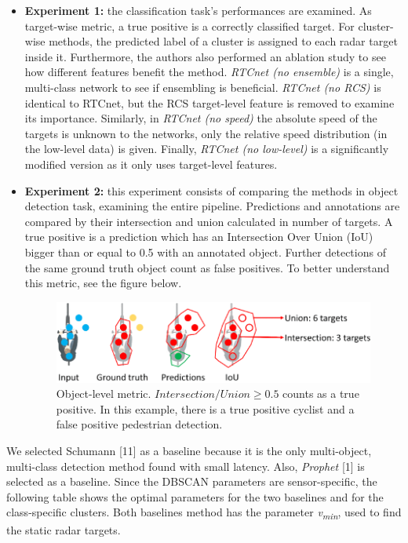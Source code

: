 \begin{itemize}
\item
  \textbf{Experiment 1:} the classification task's performances are
  examined. As target-wise metric, a true positive is a correctly
  classified target. For cluster-wise methods, the predicted label of a
  cluster is assigned to each radar target inside it. Furthermore, the
  authors also performed an ablation study to see how different features
  benefit the method. \emph{RTCnet (no ensemble)} is a single,
  multi-class network to see if ensembling is beneficial. \emph{RTCnet
  (no RCS)} is identical to RTCnet, but the RCS target-level feature is
  removed to examine its importance. Similarly, in \emph{RTCnet (no
  speed)} the absolute speed of the targets is unknown to the networks,
  only the relative speed distribution (in the low-level data) is given.
  Finally, \emph{RTCnet (no low-level)} is a significantly modified
  version as it only uses target-level features.
\item
  \textbf{Experiment 2:} this experiment consists of comparing the
  methods in object detection task, examining the entire pipeline.
  Predictions and annotations are compared by their intersection and
  union calculated in number of targets. A true positive is a prediction
  which has an Intersection Over Union (IoU) bigger than or equal to 0.5
  with an annotated object. Further detections of the same ground truth
  object count as false positives. To better understand this metric, see
  the figure below.
\newpage
  \begin{figure}[h!]
  \centering
  \includegraphics[width=0.95\linewidth]{images/iuo.png}
  \caption{Object-level metric. $Intersection / Union \geq 0.5$ counts as a true positive. In this example, there is a true positive cyclist and a false positive pedestrian detection.}
  \end{figure}
\end{itemize}

We selected Schumann {[}11{]} as a baseline because it is the only
multi-object, multi-class detection method found with small latency.
Also, \emph{Prophet} {[}1{]} is selected as a baseline. Since the DBSCAN
parameters are sensor-specific, the following table shows the optimal
parameters for the two baselines and for the class-specific clusters.
Both baselines method has the parameter \emph{v\textsubscript{min}},
used to find the static radar targets.

